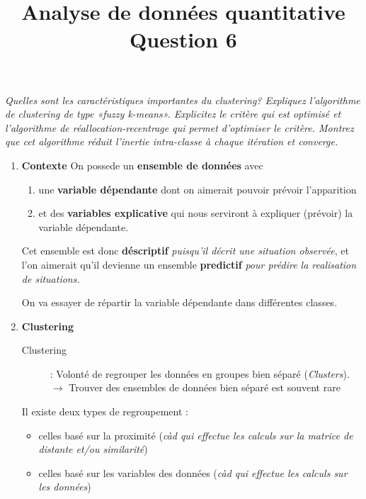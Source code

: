\documentclass[a4paper, 11pt, onecolumn]{article}
\title{Analyse de données quantitative\\Question 6}
\date{}
\begin{document}
\maketitle

\textit{Quelles sont les caractéristiques importantes du clustering? Expliquez l’algorithme de clustering de type «fuzzy k-means». Explicitez le critère qui est optimisé et l’algorithme de réallocation-recentrage qui permet d’optimiser le critère. Montrez que cet algorithme réduit l’inertie intra-classe à chaque itération et converge.}

\begin{enumerate}
\item \textbf{Contexte}
  On possede un \textbf{ensemble de données} avec 
  
  \begin{enumerate}
    \item {une \textbf{variable dépendante} dont on aimerait pouvoir prévoir l'apparition}
    \item {et des \textbf{variables explicative} qui nous serviront à expliquer (prévoir) la variable dépendante.}
  \end{enumerate}
  
  Cet ensemble est donc \textbf{déscriptif} \textit{puisqu'il décrit une situation observée}, et l'on aimerait qu'il devienne un ensemble\textbf{ predictif} \textit{pour prédire la realisation de situations.}

On va essayer de répartir la variable dépendante dans différentes classes.

  \begin{description}
  \end{description}

\item \textbf{Clustering}

  \begin{description}
    \item[Clustering] : Volonté de regrouper les données en groupes bien séparé (\textit{Clusters}). $\rightarrow$ Trouver des ensembles de données bien séparé est souvent rare
  \end{description}

Il existe deux types de regroupement : 
\begin{itemize}
  \item celles basé sur la proximité (\textit{càd qui effectue
les calculs sur la matrice de distante et/ou similarité})
\item celles basé sur les variables des données (\textit{càd qui effectue les calculs sur les
  données})
  \end{itemize}


\end{enumerate}
\end{document}
